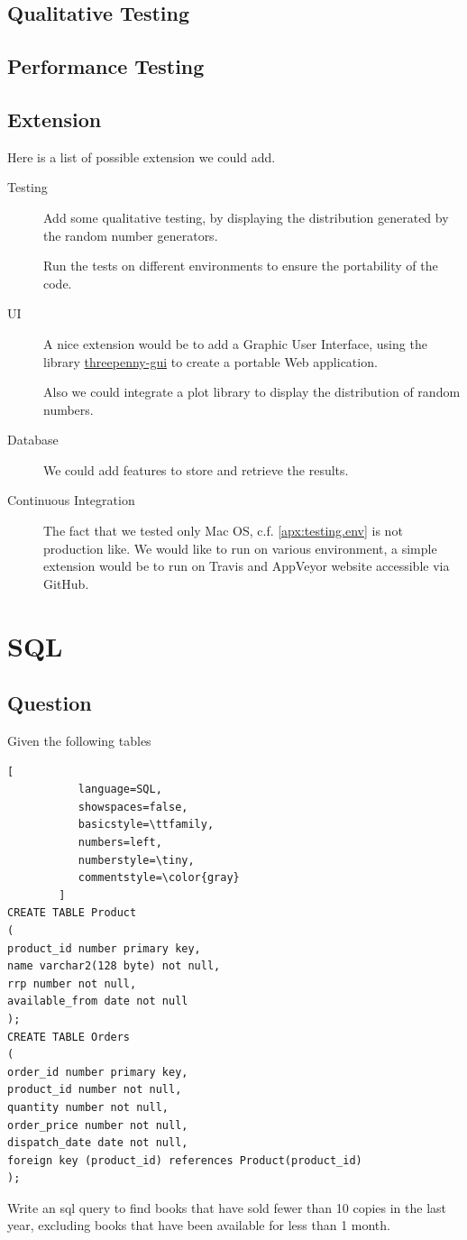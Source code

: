 \documentclass[12pt,a4paper,article]{memoir} %
\begin{document}
\section{Qualitative Testing}

\section{Performance Testing}

\section{Extension}
Here is a list of possible extension we could add.
\begin{description}
	\item [Testing]
	Add some qualitative testing, by displaying the distribution generated 
	by the random number generators.
	
	Run the tests on different environments to ensure the portability of 
	the code.
	\item [UI] 
	A nice extension would be to add a Graphic User Interface,
	using the library 
	\href{https://hackage.haskell.org/package/threepenny-gui}{threepenny-gui}
	to create a portable Web application.
	
	Also we could integrate a plot library to display the distribution of 
	random numbers.
	\item[Database]
	We could add features to store and retrieve the results.
	\item[Continuous Integration]
	The fact that we tested only Mac OS, c.f. \autoref{apx:testing.env} is 
	not production like.
	We would like to run on various environment, a simple extension would 
	be to run on Travis and AppVeyor website accessible via GitHub.
\end{description}

\newpage
\chapter{SQL}
\section{Question}
Given the following tables
\begin{lstlisting}[
           language=SQL,
           showspaces=false,
           basicstyle=\ttfamily,
           numbers=left,
           numberstyle=\tiny,
           commentstyle=\color{gray}
        ]
CREATE TABLE Product
(
product_id number primary key,
name varchar2(128 byte) not null,
rrp number not null,
available_from date not null
);
CREATE TABLE Orders
(
order_id number primary key,
product_id number not null,
quantity number not null,
order_price number not null,
dispatch_date date not null,
foreign key (product_id) references Product(product_id)
);
\end{lstlisting}
Write an sql query to find books that have sold fewer than 10 copies in the last year, 
excluding books that have been available for less than 1 month.
\end{document}
